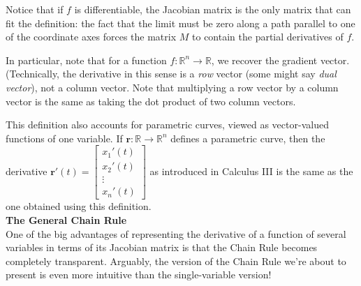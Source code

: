 
Notice that if $f$ is differentiable, the Jacobian matrix is the only matrix that can fit the definition: the fact that the limit must be zero along a path parallel to one of the coordinate axes forces the matrix $M$ to contain the partial derivatives of $f$.

In particular, note that for a function $f:\mathbb{R}^n\to \mathbb{R}$, we recover the gradient vector. (Technically, the derivative in this sense is a \emph{row} vector (some might say \emph{dual vector}), not a column vector.  Note that multiplying a row vector by a column vector is the same as taking the dot product of two column vectors. 

This definition also accounts for parametric curves, viewed as vector-valued functions of one variable. If $\mathbf{r}:\mathbb{R}\to \mathbb{R}^n$ defines a parametric curve, then the derivative $\mathbf{r}'(t) = \begin{bmatrix}x_1'(t)\\x_2'(t)\\\vdots \\x_n'(t)\end{bmatrix}$ as introduced in Calculus III is the same as the one obtained using this definition.\\

\noindent\textbf{\large The General Chain Rule}\\

One of the big advantages of representing the derivative of a function of several variables in terms of its Jacobian matrix is that the Chain Rule becomes completely transparent. Arguably, the version of the Chain Rule we're about to present is even more intuitive than the single-variable version!

